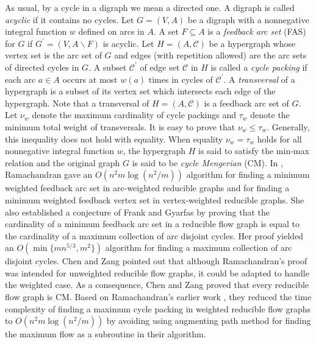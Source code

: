 \documentclass[11pt]{article}
\begin{document}
As usual, by a cycle in a digraph we mean a directed one. A digraph is called \emph{acyclic} if it contains no cycles. Let $G=(V,A)$ be a digraph with a nonnegative integral function $w$ defined on arcs in $A$. A set $F\subseteq A$ is a \emph{feedback arc set} (FAS) for $G$ if $G^\prime=(V,A\backslash F)$ is acyclic. Let $H=(A,\mathcal{C})$ be a hypergraph whose vertex set is the arc set of $G$ and edges (with repetition allowed) are the arc sets of directed cycles in $G$. A subset $\mathcal{C}^\prime$ of edge set $\mathcal{C}$ in $H$ is called a \emph{cycle packing} if each arc $a\in A$ occurs at most $w(a)$ times in cycles of $\mathcal{C}^\prime$. A \emph{transversal} of a hypergraph is a subset of its vertex set which intersects each edge of the hypergraph. Note that a transversal of $H=(A,\mathcal{C})$ is a feedback arc set of $G$. Let $\nu_w$ denote the maximum cardinality of cycle packings and $\tau_w$ denote the minimum total weight of transversals. It is easy to prove that $\nu_w\leq\tau_w$. Generally, this inequality does not hold with equality. When equality $\nu_w=\tau_w$ holds for all nonnegative integral function $w$, the hypergraph $H$ is said to satisfy the min-max relation and the original graph $G$ is said to be \emph{cycle Mengerian} (CM). In \cite{Rama1}, Ramachandran gave an $O(n^2m\log(n^2 / m))$ algorithm for finding a minimum weighted feedback arc set in arc-weighted reducible graphs and for finding a minimum weighted feedback vertex set in vertex-weighted reducible graphs. She \cite{Rama2} also established a conjecture of Frank and Gyarfas \cite{FraG} by proving that the cardinality of a minimum feedback arc set in a reducible flow graph is equal to the cardinality of a maximum collection of arc disjoint cycles. Her proof yielded an $O(\min\{mn^{5/3},m^2\})$ algorithm for finding a maximum collection of arc disjoint cycles. Chen and Zang \cite{CheZ} pointed out that although Ramachandran's proof \cite{Rama2} was intended for unweighted reducible flow graphs, it could be adapted to handle the weighted case. As a consequence, Chen and Zang proved that every reducible flow graph is CM. Based on Ramachandran's earlier work \cite{Rama1,Rama2}, they reduced the time complexity of finding a maximum cycle packing in weighted reducible flow graphs to $O(n^2 m\log(n^2/m))$  by avoiding using augmenting path method for finding the maximum flow as a subroutine in their algorithm. 
\end{document}
